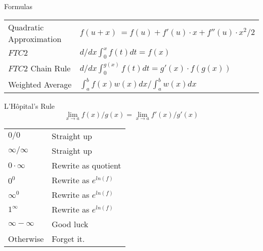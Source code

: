 %

\begin{section}{Formulas}
\begin{tabular}{l l}
  Quadratic Approximation & $f(u+x) ~= f(u) + f'(u) \cdot x + f''(u) \cdot x^2 / 2$\\
  $FTC2$ & $d/dx \int_0^x f(t) dt = f(x)$\\
  $FTC2$ Chain Rule & $d/dx \int_0^{g(x)} f(t) dt = g'(x) \cdot f(g(x))$ \\
  Weighted Average & $\int_a^b f(x) w(x) dx / \int_a^b w(x) dx$\\
\end{tabular}
\end{section}
\begin{section}{L'H\^opital's Rule}
  \[ \lim_{x \to a} f(x)/g(x) = \lim_{x \to a} f'(x)/g'(x) \]
  \begin{tabular}{l l}
    $0/0$&Straight up\\
    $\infty/\infty$&Straight up\\
    $0 \cdot \infty$ & Rewrite as quotient\\
    $0^0$& Rewrite as $e^{ln(f)}$ \\
    $\infty^0$& Rewrite as $e^{ln(f)}$ \\
    $1^\infty$& Rewrite as $e^{ln(f)}$ \\
    $\infty - \infty$&Good luck \\
    Otherwise & Forget it. \\
  \end{tabular}

\end{section}

